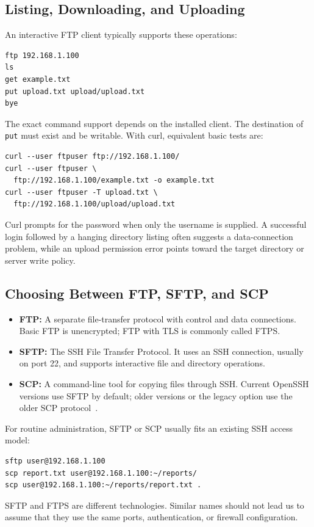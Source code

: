 \documentclass[journal]{IEEEtran}
\begin{document}
\subsection{Listing, Downloading, and Uploading}
An interactive FTP client typically supports these operations:
\begin{lstlisting}
ftp 192.168.1.100
ls
get example.txt
put upload.txt upload/upload.txt
bye
\end{lstlisting}
The exact command support depends on the installed client. The destination of \texttt{put} must exist and be writable. With curl, equivalent basic tests are:
\begin{lstlisting}
curl --user ftpuser ftp://192.168.1.100/
curl --user ftpuser \
  ftp://192.168.1.100/example.txt -o example.txt
curl --user ftpuser -T upload.txt \
  ftp://192.168.1.100/upload/upload.txt
\end{lstlisting}
Curl prompts for the password when only the username is supplied. A successful login followed by a hanging directory listing often suggests a data-connection problem, while an upload permission error points toward the target directory or server write policy.

\subsection{Choosing Between FTP, SFTP, and SCP}
\begin{itemize}
    \item \textbf{FTP:} A separate file-transfer protocol with control and data connections. Basic FTP is unencrypted; FTP with TLS is commonly called FTPS.
    \item \textbf{SFTP:} The SSH File Transfer Protocol. It uses an SSH connection, usually on port 22, and supports interactive file and directory operations.
    \item \textbf{SCP:} A command-line tool for copying files through SSH. Current OpenSSH versions use SFTP by default; older versions or the legacy option use the older SCP protocol~\cite{scp}.
\end{itemize}
For routine administration, SFTP or SCP usually fits an existing SSH access model:
\begin{lstlisting}
sftp user@192.168.1.100
scp report.txt user@192.168.1.100:~/reports/
scp user@192.168.1.100:~/reports/report.txt .
\end{lstlisting}
SFTP and FTPS are different technologies. Similar names should not lead us to assume that they use the same ports, authentication, or firewall configuration.
\end{document}
